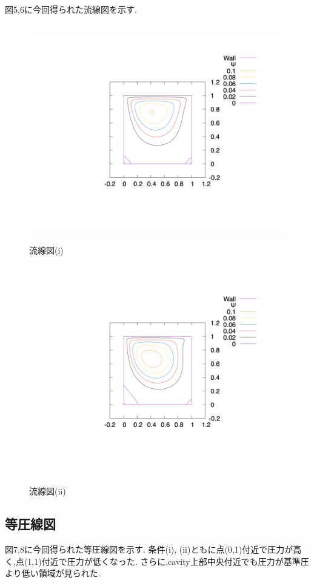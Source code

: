 \documentclass[upLaTeX,a4paper]{jsarticle}
\begin{document}
図5,6に今回得られた流線図を示す.

\begin{figure}[H]
  \centering
  \includegraphics[height=9.5cm, clip, trim=0 200 0 0]{outputs/img/stream_line_re50.png}
  \caption{流線図(i)}
  \label{fig:velocity_vector_re50}
\end{figure}
\begin{figure}[H]
  \centering
  \includegraphics[height=9.5cm, clip, trim=0 200 0 0]{outputs/img/stream_line_re200.png}
  \caption{流線図(ii)}
  \label{fig:velocity_vector_re200}
\end{figure}


\subsection{等圧線図}
図7,8に今回得られた等圧線図を示す.
条件(i), (ii)ともに点(0,1)付近で圧力が高く,点(1,1)付近で圧力が低くなった.
さらに,cavity上部中央付近でも圧力が基準圧より低い領域が見られた.
\end{document}
